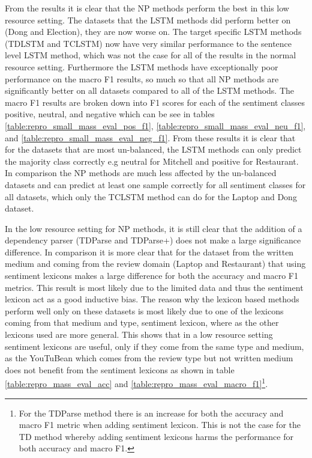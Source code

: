 From the results it is clear that the NP methods perform the best in this low resource setting. The datasets that the LSTM methods did perform better on (Dong and Election), they are now worse on. The target specific LSTM methods (TDLSTM and TCLSTM) now have very similar performance to the sentence level LSTM method, which was not the case for all of the results in the normal resource setting. Furthermore the LSTM methods have exceptionally poor performance on the macro F1 results, so much so that all NP methods are significantly better on all datasets compared to all of the LSTM methods. The macro F1 results are broken down into F1 scores for each of the sentiment classes positive, neutral, and negative which can be see in tables \ref{table:repro_small_mass_eval_pos_f1}, \ref{table:repro_small_mass_eval_neu_f1}, and \ref{table:repro_small_mass_eval_neg_f1}. From these results it is clear that for the datasets that are most un-balanced, the LSTM methods can only predict the majority class correctly e.g neutral for Mitchell and positive for Restaurant. In comparison the NP methods are much less affected by the un-balanced datasets and can predict at least one sample correctly for all sentiment classes for all datasets, which only the TCLSTM method can do for the Laptop and Dong dataset. 

In the low resource setting for NP methods, it is still clear that the addition of a dependency parser (TDParse and TDParse+)  does not make a large significance difference. In comparison it is more clear that for the dataset from the written medium and coming from the review domain (Laptop and Restaurant) that using sentiment lexicons makes a large difference for both the accuracy and macro F1 metrics. This result is most likely due to the limited data and thus the sentiment lexicon act as a good inductive bias. The reason why the lexicon based methods perform well only on these datasets is most likely due to one of the lexicons coming from that medium and type, \citet{hu2004mining} sentiment lexicon, where as the other lexicons used are more general. This shows that in a low resource setting sentiment lexicons are useful, only if they come from the same type and medium, as the YouTuBean which comes from the review type but not written medium does not benefit from the sentiment lexicons as shown in table \ref{table:repro_mass_eval_acc} and \ref{table:repro_mass_eval_macro_f1}\footnote{For the TDParse method there is an increase for both the accuracy and macro F1 metric when adding sentiment lexicon. This is not the case for the TD method whereby adding sentiment lexicons harms the performance for both accuracy and macro F1.}.

